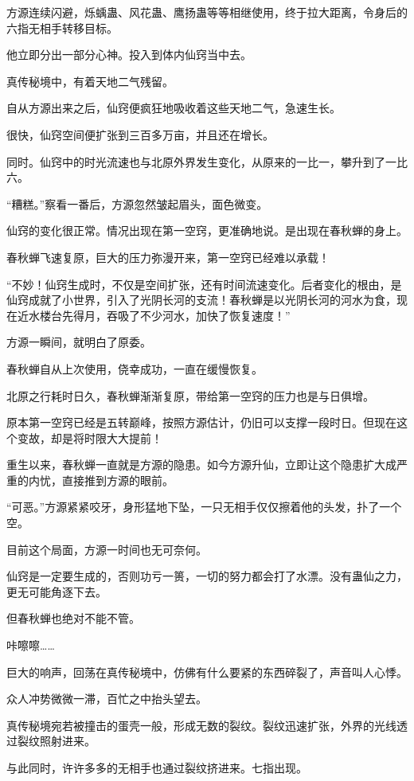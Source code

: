 \begin{this_body}
方源连续闪避，烁蝺蛊、风花蛊、鹰扬蛊等等相继使用，终于拉大距离，令身后的六指无相手转移目标。

他立即分出一部分心神。投入到体内仙窍当中去。

真传秘境中，有着天地二气残留。

自从方源出来之后，仙窍便疯狂地吸收着这些天地二气，急速生长。

很快，仙窍空间便扩张到三百多万亩，并且还在增长。

同时。仙窍中的时光流速也与北原外界发生变化，从原来的一比一，攀升到了一比六。

“糟糕。”察看一番后，方源忽然皱起眉头，面色微变。

仙窍的变化很正常。情况出现在第一空窍，更准确地说。是出现在春秋蝉的身上。

春秋蝉飞速复原，巨大的压力弥漫开来，第一空窍已经难以承载！

“不妙！仙窍生成时，不仅是空间扩张，还有时间流速变化。后者变化的根由，是仙窍成就了小世界，引入了光阴长河的支流！春秋蝉是以光阴长河的河水为食，现在近水楼台先得月，吞吸了不少河水，加快了恢复速度！”

方源一瞬间，就明白了原委。

春秋蝉自从上次使用，侥幸成功，一直在缓慢恢复。

北原之行耗时日久，春秋蝉渐渐复原，带给第一空窍的压力也是与日俱增。

原本第一空窍已经是五转巅峰，按照方源估计，仍旧可以支撑一段时日。但现在这个变故，却是将时限大大提前！

重生以来，春秋蝉一直就是方源的隐患。如今方源升仙，立即让这个隐患扩大成严重的内忧，直接推到方源的眼前。

“可恶。”方源紧紧咬牙，身形猛地下坠，一只无相手仅仅擦着他的头发，扑了一个空。

目前这个局面，方源一时间也无可奈何。

仙窍是一定要生成的，否则功亏一篑，一切的努力都会打了水漂。没有蛊仙之力，更无可能角逐下去。

但春秋蝉也绝对不能不管。

咔嚓嚓……

巨大的响声，回荡在真传秘境中，仿佛有什么要紧的东西碎裂了，声音叫人心悸。

众人冲势微微一滞，百忙之中抬头望去。

真传秘境宛若被撞击的蛋壳一般，形成无数的裂纹。裂纹迅速扩张，外界的光线透过裂纹照射进来。

与此同时，许许多多的无相手也通过裂纹挤进来。七指出现。


\end{this_body}
